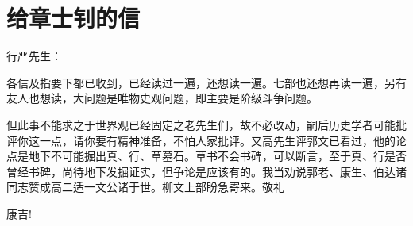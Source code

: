 \section[给章士钊的信（一九六五年七月十八日）]{给章士钊的信}


\noindent 行严先生：

各信及指要下都已收到，已经读过一遍，还想读一遍。七部也还想再读一遍，另有友人也想读，大问题是唯物史观问题，即主要是阶级斗争问题。

但此事不能求之于世界观已经固定之老先生们，故不必改动，嗣后历史学者可能批评你这一点，请你要有精神准备，不怕人家批评。又高先生评郭文已看过，他的论点是地下不可能掘出真、行、草墓石。草书不会书碑，可以断言，至于真、行是否曾经书碑，尚待地下发掘证实，但争论是应该有的。我当劝说郭老、康生、伯达诸同志赞成高二适一文公诸于世。柳文上部盼急寄来。敬礼

康吉!



